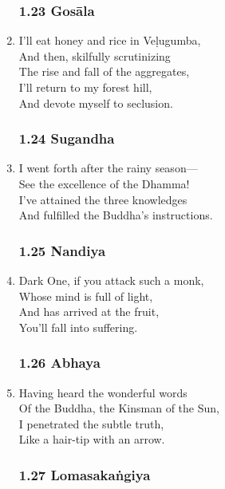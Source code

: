 \documentclass[10pt, openany]{book}
\begin{document}
\begin{enumerate}
\subsubsection*{1.23 Gosāla}

\item I’ll eat honey and rice in Veḷugumba,\\
And then, skilfully scrutinizing \\
The rise and fall of the aggregates,\\
I’ll return to my forest hill,\\
And devote myself to seclusion.

\subsubsection*{1.24 Sugandha}

\item I went forth after the rainy season—\\
See the excellence of the Dhamma!\\
I’ve attained the three knowledges\\
And fulfilled the Buddha’s instructions.

\subsubsection*{1.25 Nandiya}

\item Dark One, if you attack such a monk, \\
Whose mind is full of light,\\
And has arrived at the fruit,\\
You’ll fall into suffering.

\subsubsection*{1.26 Abhaya}

\item Having heard the wonderful words\\
Of the Buddha, the Kinsman of the Sun,\\
I penetrated the subtle truth,\\
Like a hair-tip with an arrow.

\subsubsection*{1.27 Lomasakaṅgiya}


\end{enumerate}
\end{document}
